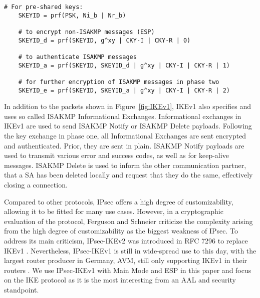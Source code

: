 \begin{lstlisting}[float=ht, caption=IKE Keying, label=lst:keying]
	# For pre-shared keys: 
	SKEYID = prf(PSK, Ni_b | Nr_b)
	
	# to encrypt non-ISAKMP messages (ESP)
	SKEYID_d = prf(SKEYID, g^xy | CKY-I | CKY-R | 0)
	
	# to authenticate ISAKMP messages
	SKEYID_a = prf(SKEYID, SKEYID_d | g^xy | CKY-I | CKY-R | 1)
	
	# for further encryption of ISAKMP messages in phase two
	SKEYID_e = prf(SKEYID, SKEYID_a | g^xy | CKY-I | CKY-R | 2)
\end{lstlisting}

In addition to the packets shown in Figure~\ref{fig:IKEv1}, IKEv1 also specifies and uses so called ISAKMP Informational Exchanges. Informational exchanges in IKEv1 are used to send ISAKMP Notify or ISAKMP Delete payloads. Following the key exchange in phase one, all Informational Exchanges are sent encrypted and authenticated. Prior, they are sent in plain. ISAKMP Notify payloads are used to transmit various error and success codes, as well as for keep-alive messages. ISAKMP Delete is used to inform the other communication partner, that a SA has been deleted locally and request that they do the same, effectively closing a connection. 

Compared to other protocols, IPsec offers a high degree of customizability, allowing it to be fitted for many use cases. However, in a cryptographic evaluation of the protocol, Ferguson and Schneier \textcite{ferguson1999cryptographic} criticize the complexity arising from the high degree of customizability as the biggest weakness of IPsec. To address its main criticism, IPsec-IKEv2 was introduced in RFC 7296 to replace IKEv1 \parencite{kaufman2014internet}. Nevertheless, IPsec-IKEv1 is still in wide-spread use to this day, with the largest router producer in Germany, AVM, still only supporting IKEv1 in their routers \parencite{avm2022}. We use IPsec-IKEv1 with Main Mode and ESP in this paper and focus on the IKE protocol as it is the most interesting from an AAL and security standpoint. %
